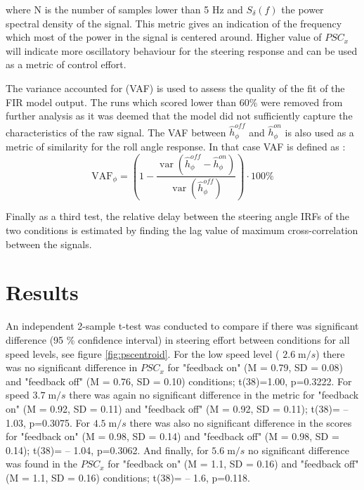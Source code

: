 where N is the number of samples lower than 5 Hz and \(S_\delta(f)\) the power spectral density of the signal. This metric gives an indication of the frequency  which most of the power in the signal is centered around. Higher value of \(PSC_x\) will indicate more oscillatory behaviour for the steering response and can be used as a metric of control effort.

The variance accounted for (VAF) is  used to assess  the quality of the fit of the FIR model output. The runs which scored lower than 60\% were removed from further analysis as it was deemed that the model did not sufficiently capture the characteristics of the raw signal. The VAF between  \(\hat{h}_\phi^{off}\) and \(\hat{h}_\phi^{on}\) is also used as a metric of similarity for the roll angle response. In that case VAF is defined as :
\begin{equation}
\mathrm{VAF}_{\phi}=\left(1-\frac{\operatorname{var}\left(\hat{h}_\phi^{off}-\hat{h}_\phi^{on}\right)}{\operatorname{var}\left(\hat{h}_\phi^{off}\right)}\right) \cdot 100 \%
\label{eq:3}
\end{equation}


Finally as a third test, the relative delay between the steering angle IRFs of the two conditions is estimated by finding the lag value of maximum cross-correlation between the signals.

\section{Results}

An independent 2-sample  t-test was conducted to compare if there was significant difference (95 \% confidence interval) in steering effort between conditions for all speed levels, see figure \ref{fig:pscentroid}. For the low speed level ( \(2.6 \;\si{\meter\per s}\)) there was no significant difference in \(PSC_x\) for "feedback on" (M = 0.79, SD = 0.08) and "feedback off" (M = 0.76, SD = 0.10) conditions; t(38)=1.00, p=0.3222. For speed  \(3.7\; \si{\meter\per s}\) there was again no significant difference in the metric for "feedback on" (M = 0.92, SD = 0.11) and "feedback off" (M = 0.92, SD = 0.11); t(38)= -- 1.03, p=0.3075. For  \( 4.5 \;\si{\meter\per s}\) there was also no significant difference in the scores for "feedback on" (M = 0.98, SD = 0.14) and "feedback off" (M = 0.98, SD = 0.14); t(38)= -- 1.04, p=0.3062. And finally, for \( 5.6\; \si{\meter\per s}\) no significant difference was found in the \(PSC_x\) for "feedback on" (M = 1.1, SD = 0.16) and "feedback off" (M = 1.1, SD = 0.16) conditions; t(38)= -- 1.6, p=0.118. 

